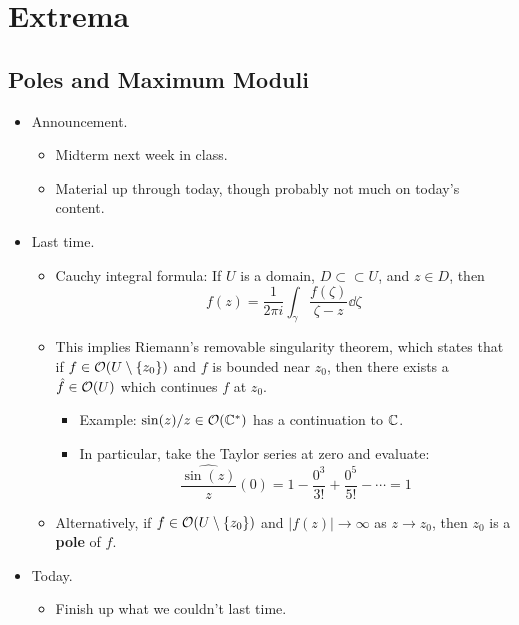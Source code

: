\documentclass[../notes.tex]{subfiles}
\begin{document}
\chapter{Extrema}
\section{Poles and Maximum Moduli}
\begin{itemize}
    \item {}Announcement.
    \begin{itemize}
        \item Midterm next week in class.
        \item Material up through today, though probably not much on today's content.
    \end{itemize}
    \item Last time.
    \begin{itemize}
        \item Cauchy integral formula: If $U$ is a domain, $D\subset\subset U$, and $z\in D$, then
        \begin{equation*}
            f(z) = \frac{1}{2\pi i}\int_\gamma\frac{f(\zeta)}{\zeta-z}\dd{\zeta}
        \end{equation*}
        \item This implies Riemann's removable singularity theorem, which states that if $f\in\mathcal{O}(U\setminus\{z_0\})$ and $f$ is bounded near $z_0$, then there exists a $\hat{f}\in\mathcal{O}(U)$ which continues $f$ at $z_0$.
        \begin{itemize}
            \item Example: $\sin(z)/z\in\mathcal{O}(\mathbb{C}^*)$ has a continuation to $\mathbb{C}$.
            \item In particular, take the Taylor series at zero and evaluate:
            \begin{equation*}
                \widehat{\frac{\sin(z)}{z}}(0) = 1-\frac{0^3}{3!}+\frac{0^5}{5!}-\cdots = 1
            \end{equation*}
        \end{itemize}
        \item Alternatively, if $f\in\mathcal{O}(U\setminus\{z_0\})$ and $|f(z)|\to\infty$ as $z\to z_0$, then $z_0$ is a \textbf{pole} of $f$.
    \end{itemize}
    \item Today.
    \begin{itemize}
        \item Finish up what we couldn't last time.

\end{itemize}
\end{itemize}
\end{document}
